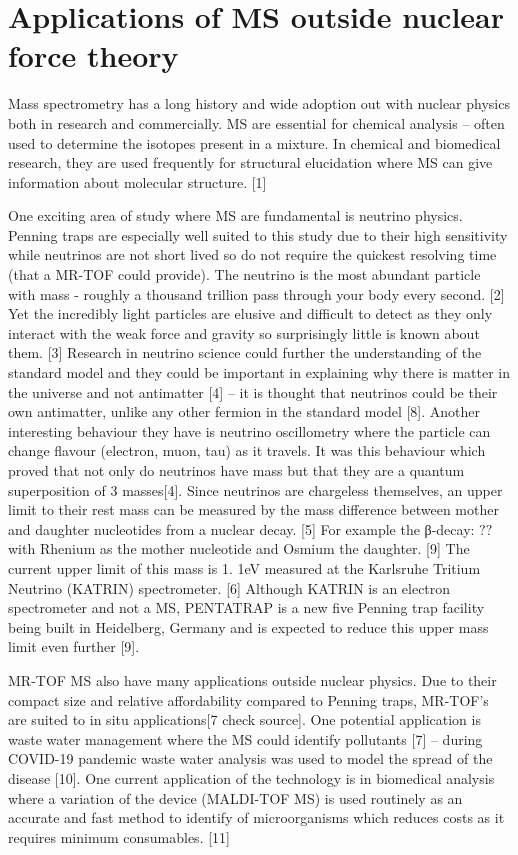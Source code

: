\section{Applications of MS outside nuclear force theory}

Mass spectrometry has a long history and wide adoption out with nuclear physics both in research and commercially.
MS are essential for chemical analysis – often used to determine the isotopes present in a mixture.
In chemical and biomedical research, they are used frequently for structural elucidation where MS can give information about molecular structure. [1] 

One exciting area of study where MS are fundamental is neutrino physics.
Penning traps are especially well suited to this study due to their high sensitivity while neutrinos are not short lived so do not require the quickest resolving time (that a MR-TOF could provide).
The neutrino is the most abundant particle with mass - roughly a thousand trillion pass through your body every second. [2]
Yet the incredibly light particles are elusive and difficult to detect as they only interact with the weak force and gravity so surprisingly little is known about them. [3]
Research in neutrino science could further the understanding of the standard model and they could be important in explaining why there is matter in the universe and not antimatter [4] – it is thought that neutrinos could be their own antimatter, unlike any other fermion in the standard model [8].
Another interesting behaviour they have is neutrino oscillometry where the particle can change flavour (electron, muon, tau) as it travels.
It was this behaviour which proved that not only do neutrinos have mass but that they are a quantum superposition of 3 masses[4].
Since neutrinos are chargeless themselves, an upper limit to their rest mass can be measured by the mass difference between mother and daughter nucleotides from a nuclear decay. [5]
For example the β-decay: $??$ with Rhenium as the mother nucleotide and Osmium the daughter. [9]
The current upper limit of this mass is 1.
1eV measured at the Karlsruhe Tritium Neutrino (KATRIN) spectrometer. [6]
Although KATRIN is an electron spectrometer and not a MS, PENTATRAP is a new five Penning trap facility being built in Heidelberg, Germany and is expected to reduce this upper mass limit even further [9].

MR-TOF MS also have many applications outside nuclear physics.
Due to their compact size and relative affordability compared to Penning traps, MR-TOF's are suited to in situ applications[7 check source].
One potential application is waste water management where the MS could identify pollutants [7] – during COVID-19 pandemic waste water analysis was used to model the spread of the disease [10].
One current application of the technology is in biomedical analysis where a variation of the device (MALDI-TOF MS) is used routinely as an accurate and fast method to identify of microorganisms which reduces costs as it requires minimum consumables. [11]
